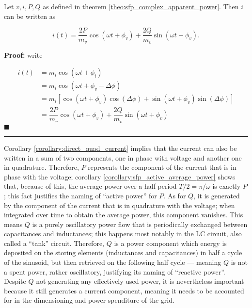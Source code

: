 \begin{corollary}\label{corollary:direct_quad_current} %
	Let $v,i,P,Q$ as defined in theorem \ref{theo:sfp_complex_apparent_power}. Then $i$ can be written as

\begin{equation} i(t) = \dfrac{2P}{m_v}\cos\left(\omega t + \phi_v\right) + \dfrac{2Q}{m_v}\sin\left(\omega t + \phi_v\right) .\end{equation}
\end{corollary}
\textbf{Proof:} write

\begin{align}
	i(t)
	&= m_i\cos\left(\omega t + \phi_i\right) \nonumber\\[3mm]
	&= m_i\cos\left(\omega t + \phi_v - \Delta\phi\right) \nonumber\\[3mm]
	&= m_i\left[\cos\left(\omega t + \phi_v\right)\cos\left(\Delta\phi\right) + \sin\left(\omega t + \phi_v\right)\sin\left(\Delta\phi\right) \right] \nonumber\\[3mm]
	&= \dfrac{2P}{m_v}\cos\left(\omega t + \phi_v\right) + \dfrac{2Q}{m_v}\sin\left(\omega t + \phi_v\right)
\end{align} \hfill$\blacksquare$

\vspace{5mm}
\hrule
\vspace{5mm} %

	Corollary \ref{corollary:direct_quad_current} implies that the current can also be written in a sum of two components, one in phase with voltage and another one in quadrature. Therefore, $P$ represents the component of the current that is in phase with the voltage; corollary \ref{corollary:sfp_active_average_power} shows that, because of this, the average power over a half-period $T/2 = \pi/\omega$ is exactly $P$; this fact justifies the naming of ``active power'' for $P$. As for $Q$, it is generated by the component of the current that is in quadrature with the voltage; when integrated over time to obtain the average power, this component vanishes. This means $Q$ is a purely oscillatory power flow that is periodically exchanged between capacitances and inductances; this happens most notably in the LC circuit, also called a ``tank'' circuit. Therefore, $Q$ is a power component which energy is deposited on the storing elements (inductances and capacitances) in half a cycle of the sinusoid, but then retrieved on the following half cycle — meaning $Q$ is not a spent power, rather oscillatory, justifying its naming of ``reactive power''. Despite $Q$ not generating any effectively used power, it is nevertheless important because it still generates a current component, meaning it needs to be accounted for in the dimensioning and power spenditure of the grid.

